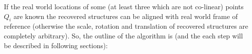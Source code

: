 \documentclass[12pt]{article}
\begin{document}

If the real world locations of some (at least three which are not co-linear) points $Q_i$ are known the recovered structures can be aligned with real world frame of reference (otherwise the scale, rotation and translation of recovered structures are completely arbitrary). So, the outline of the algorithm is (and the each step will be described in following sections):
\end{document}

